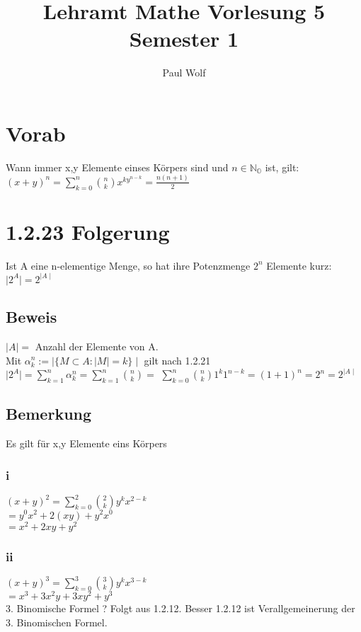\documentclass[11pt]{scrartcl}
\title{Lehramt Mathe Vorlesung 5 Semester 1}
\author{Paul Wolf}
\begin{document}
\maketitle
\tableofcontents

\section{Vorab}
\label{sec:vorab-1.2.14}
Wann immer x,y Elemente einses Körpers sind und $n \in \mathbb{N_{O}}$ ist, gilt:
$(x+y)^n = \sum \limits_{k=0}^n {n \choose k } x^{ky^{n-k}} = \frac{n(n+1)}{2} $

\section{1.2.23 Folgerung}
Ist A eine n-elementige Menge, so hat ihre Potenzmenge $2^{n}$ Elemente kurz: $ \mid 2^{A} \mid = 2^{\mid A \mid}$

\subsection*{Beweis}
$\mid A \mid = $ Anzahl der Elemente von A. \\
Mit  $\alpha_k^n := \mid \{M \subset A : \mid M \mid = k \} \mid$ gilt nach 1.2.21 \\
$\mid 2^{A} \mid = \sum \limits_{k=1}^n \alpha_k^n = \sum \limits_{k=1}^n {n \choose k} = $
$\sum \limits_{k=0}^n {n \choose k} 1^{k} 1^{n-k} = (1+1)^{n}=2^{n}=2^{\mid A \mid}$

\subsection*{Bemerkung}
Es gilt für x,y Elemente eins Körpers
\subsubsection*{i}
$(x+y)^2 = \sum \limits_{k=0}^2 {2 \choose k} y^{k} x^{2-k} $ \\ 
$=y^0 x^2 + 2(xy) +y^2 x^0$ \\
$ = x^2 + 2xy +y^2 $

\subsubsection*{ii}
$(x+y)^3 = \sum \limits_{k=0}^3 {3 \choose k} y^{k} x^{3-k}$ \\
$ = x^3 + 3x^2 y + 3xy^2 + y^3$ \\
3. Binomische Formel ? Folgt aus 1.2.12. Besser 1.2.12 ist Verallgemeinerung der 3. Binomischen Formel.\\
\end{document}
